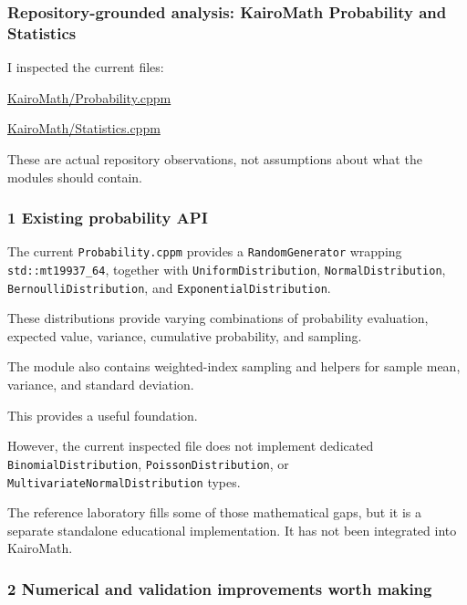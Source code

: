 \subsubsection{Repository-grounded analysis: KairoMath Probability and Statistics}\label{02-foundations-ii-ch039-repository-grounded-analysis-kairomath-probability-and-statistics}

I inspected the current files:

\href{https://github.com/swayam8624/KairoMath/blob/master/Probability.cppm?utm_source=chatgpt.com}{KairoMath/Probability.cppm}

\href{https://github.com/swayam8624/KairoMath/blob/master/Statistics.cppm?utm_source=chatgpt.com}{KairoMath/Statistics.cppm}

These are actual repository observations, not assumptions about what the modules should contain.

\subsubsection{1 Existing probability API}\label{02-foundations-ii-ch039-existing-probability-api}

The current \texttt{Probability.cppm} provides a \texttt{RandomGenerator} wrapping \texttt{std::mt19937\_64}, together with \texttt{UniformDistribution}, \texttt{NormalDistribution}, \texttt{BernoulliDistribution}, and \texttt{ExponentialDistribution}.

These distributions provide varying combinations of probability evaluation, expected value, variance, cumulative probability, and sampling.

The module also contains weighted-index sampling and helpers for sample mean, variance, and standard deviation.

This provides a useful foundation.

However, the current inspected file does not implement dedicated \texttt{BinomialDistribution}, \texttt{PoissonDistribution}, or \texttt{MultivariateNormalDistribution} types.

The reference laboratory fills some of those mathematical gaps, but it is a separate standalone educational implementation. It has not been integrated into KairoMath.

\subsubsection{2 Numerical and validation improvements worth making}\label{02-foundations-ii-ch039-numerical-and-validation-improvements-worth-making}

